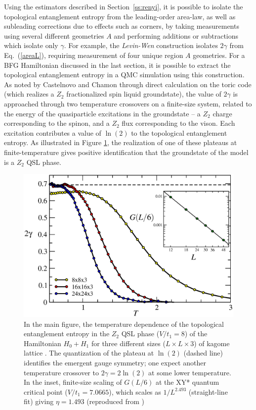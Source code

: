 \documentclass[range]{ar2e}
\begin{document}
Using the estimators described in Section~\ref{ss:renyi}, it is possible to isolate the topological entanglement entropy from the leading-order area-law, as well as subleading corrections due to effects such as corners, by taking measurements using several different geometries $A$ and performing additions or subtractions which isolate only $\gamma$.  For example, the {\it Levin-Wen} \cite{LW} construction isolates $2\gamma$ from Eq.~(\ref{areaL}), requiring measurement of four unique region $A$ geometries.  For a BFG Hamiltonian discussed in the last section, it is possible to extract the topological entanglement entropy in a QMC simulation using this construction.  As noted by Castelnovo and Chamon \cite{castelnovo} through direct calculation on the toric code (which realizes a $Z_2$ fractionalized spin liquid groundstate), the value of $2\gamma$ is approached through two temperature crossovers on a finite-size system, related to the energy of the quasiparticle excitations in the groundstate -- a $Z_2$ charge corresponding to the spinon, and a $Z_2$ flux corresponding to the vison.  Each excitation contributes a value of $\ln(2)$ to the topological entanglement entropy.  As illustrated in Figure \ref{QSLfig}, the realization of one of these plateaus at finite-temperature gives positive identification that the groundstate of the model is a $Z_2$ QSL phase.

\begin{figure}
\centerline{\includegraphics[width=4.5in]{QSL}}
\caption{In the main figure, the temperature dependence of the topological entanglement entropy in the $Z_2$ QSL phase ($V/t_1 = 8$) of the Hamiltonian $H_0 + H_1$ for three different sizes ($L \times L \times 3$) of kagome lattice \cite{TopoEE}.  The quantization of the plateau at $\ln(2)$ (dashed line) identifies the emergent gauge symmetry; one expect another temperature crossover to $2 \gamma = 2 \ln(2)$ at some lower temperature.  In the inset, finite-size scaling of
$G(L/6)$ at the XY* quantum critical point ($V/t_1 = 7.0665$), which scales as  $1/L^{2.493}$ (straight-line fit) giving $\eta = 1.493$ (reproduced from \cite{XYstarQMC})
\label{QSLfig}}
\end{figure}
\end{document}
